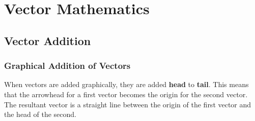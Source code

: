 	
	
	
	
\section{Vector Mathematics}
	\subsection{Vector Addition} 
	\subsubsection{Graphical Addition of Vectors} 
	When vectors are added graphically, they are added \textbf{head} to \textbf{tail}.  This means that the arrowhead for a first vector becomes the origin for the second vector.  The \gls{resultant} vector is a straight line between the origin of the first vector and the head of the second.  
	
